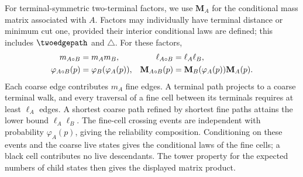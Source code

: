 \begin{example}
\begin{table}[H]
\centering\scriptsize
\setlength{\tabcolsep}{2pt}
\renewcommand{\arraystretch}{1.25}
\caption{Tie and gem have the same three critical dimensions.}
\label{tab:tie-gem-detail}
\end{table}
\end{example}

For terminal-symmetric two-terminal factors, we use $\mathbf M_A$ for the conditional mass matrix associated with $A$.
Factors may individually have terminal distance or minimum cut one, provided their interior conditional laws are defined; this includes $\twoedgepath$ and $\triangle$.
For these factors,
\begin{align}
 m_{A\circ B}&=m_A m_B,&\ell_{A\circ B}&=\ell_A\ell_B,\notag\\
 \varphi_{A\circ B}(p)&=\varphi_B(\varphi_A(p)),&
 \mathbf M_{A\circ B}(p)&=\mathbf M_B(\varphi_A(p))\mathbf M_A(p).\label{eq:substitution-responses}
\end{align}
Each coarse edge contributes $m_A$ fine edges.
A terminal path projects to a coarse terminal walk, and every traversal of a fine cell between its terminals requires at least $\ell_A$ edges.
A shortest coarse path refined by shortest fine paths attains the lower bound $\ell_A\ell_B$.
The fine-cell crossing events are independent with probability $\varphi_A(p)$, giving the reliability composition.
Conditioning on these events and the coarse live states gives the conditional laws of the fine cells; a black cell contributes no live descendants.
The tower property for the expected numbers of child states then gives the displayed matrix product.



